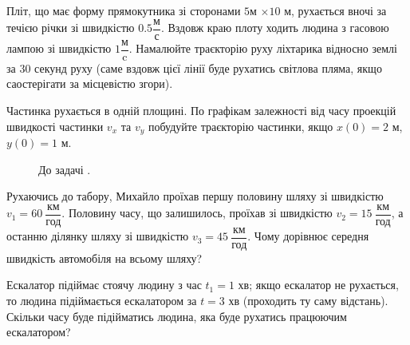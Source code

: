 \justifying
\begin{problem}{1}
	Пліт, що має форму прямокутника зі сторонами $5$м $\times 10$ м, рухається вночі за течією річки зі швидкістю $0.5 \dfrac{\text{м}}{\text{с}}$. Вздовж краю плоту ходить людина з гасовою лампою зі швидкістю $1 \dfrac{\text{м}}{\text{c}}$. Намалюйте траєкторію руху ліхтарика відносно землі за $30$ секунд руху (саме вздовж цієї лінії буде рухатись світлова пляма, якщо саостерігати за місцевістю згори). 
\end{problem}

\begin{problem}{1}
	Частинка рухається в одній площині. По графікам залежності від часу проекцій швидкості частинки $v_x$ та $v_y$ побудуйте траєкторію частинки, якщо $x(0) = 2$ м, $y(0) = 1$ м.
	
	\begin{figure}[h!]
		\hfill
		\caption{До задачі .}
	\end{figure}
\end{problem}

\begin{problem}{1}
	Рухаючись до табору, Михайло проїхав першу половину шляху зі швидкістю $v_1 = 60~ \dfrac{\text{км}}{\text{год}}$. Половину часу, що залишилось, проїхав зі швидкістю $v_2 = 15~\dfrac{\text{км}}{\text{год}}$, а останню ділянку шляху зі швидкістю $v_3 = 45~ \dfrac{\text{км}}{\text{год}}$. Чому дорівнює середня швидкість автомобіля на всьому шляху?
\end{problem}


\begin{problem}{2}
	Ескалатор підіймає стоячу людину з час $t_1 = 1$ хв; якщо ескалатор не рухається, то людина підіймається ескалатором за $t = 3$ хв (проходить ту саму відстань). Скільки часу буде підійматись людина, яка буде рухатись працюючим ескалатором?
\end{problem}

